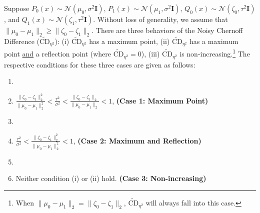 \documentclass[10pt,a4paper]{amsart}
\begin{document}
\begin{theorem}
    Suppose $P_0(x)\sim\mathcal{N}(\mu_0,\sigma^2\mathbf{I})$, $P_1(x)\sim\mathcal{N}(\mu_1,\sigma^2\mathbf{I})$, $Q_0(x)\sim\mathcal{N}(\zeta_0,\tau^2\mathbf{I})$, and $Q_1(x)\sim\mathcal{N}(\zeta_1,\tau^2\mathbf{I})$. Without loss of generality, we assume that $\|\mu_0 - \mu_1\|_2 \geq \|\zeta_0 - \zeta_1\|_2$. There are three behaviors of the Noisy Chernoff Difference ($\widetilde{\text{CD}}_{\eta^2}$): (i) $\widetilde{\text{CD}}_{\eta^2}$ has a maximum point, (ii) $\widetilde{\text{CD}}_{\eta^2}$ has a maximum point \underline{and} a reflection point (where $\widetilde{\text{CD}}_{\eta^2} = 0$), (iii) $\widetilde{\text{CD}}_{\eta^2}$ is non-increasing.\footnote{When $\|\mu_0 - \mu_1\|_2 = \|\zeta_0 - \zeta_1\|_2$, $\widetilde{\text{CD}}_{\eta^2}$ will always fall into this case.} The respective conditions for these three cases are given as follows:
    \begin{enumerate}
    \item[]
        \item[(i)] $\frac{\|\zeta_0 - \zeta_1\|^2_2}{\|\mu_0 - \mu_1\|^2_2} <\frac{\tau^2}{\sigma^2} < \frac{\|\zeta_0 - \zeta_1\|_2}{\|\mu_0 - \mu_1\|_2} < 1$,  \hfill \textbf{(Case 1: Maximum Point)}

    \item[]     
        \item [(ii)] $\frac{\tau^2}{\sigma^2} < \frac{\|\zeta_0 - \zeta_1\|^2_2}{\|\mu_0 - \mu_1\|^2_2} < 1$, \hfill \textbf{(Case 2: Maximum and Reflection)}
        
    \item[]  
        \item [(iii)] Neither condition (i) or (ii) hold. \hfill \textbf{(Case 3: Non-increasing)}
    \end{enumerate}    %
\end{theorem}
\end{document}
